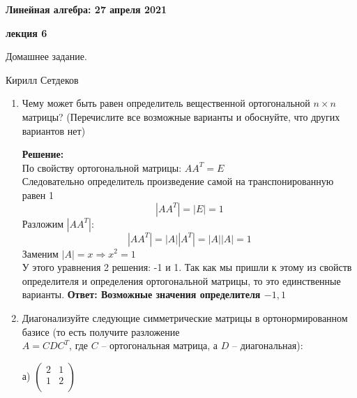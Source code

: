 \documentclass[a4paper,12pt]{article}
\newcounter{z}
\renewcommand{\date}{{\bf 27 апреля 2021}}
\newcommand{\HSEhat}{
\vspace*{-0pt}
\noindent
\setcounter{z}{0}


{\bf \phantom{\date}  \large \hfill Линейная алгебра: \hfill \normalsize \date}

\vspace{5 pt}
{\bf \large \hfill  лекция 6\hfill }

\vspace{15 pt}
\centerline{ \large  Домашнее задание.}
\centerline{ \large  Кирилл Сетдеков}



\vspace*{10pt}
\setcounter{z}{0}

}
\begin{document}
\HSEhat


\begin{enumerate}

\subsection*{Задачи:}



\item Чему может быть равен определитель вещественной ортогональной $n \times n$ матрицы? (Перечислите все возможные варианты и обоснуйте, что других вариантов нет)

\vspace{5pt}

\textbf{Решение:}\\
По свойству ортогональной матрицы: $AA^T = E$\\ 
Следовательно определитель произведение самой на транспонированную равен 1 $$|AA^T| = |E|=1$$
Разложим $|AA^T|$:
$$|AA^T|=|A||A^T|=|A||A|=1$$
Заменим $|A|=x\Rightarrow x^2 =1$\\
У этого уравнения 2 решения: -1 и 1. Так как мы пришли к этому из свойств определителя и определения ортогональной матрицы, то это единственные варианты.
\textbf{Ответ: Возможные значения определителя $-1,1$}


\item Диагонализуйте следующие симметрические матрицы в ортонормированном базисе (то есть получите разложение\\ $A = C D C^T$, где $C$ -- ортогональная матрица, а $D$ -- диагональная):

\vspace{5pt}


а)  
$
\begin{pmatrix}
{2}&{1}\\
{1}&{2}\\
\end{pmatrix}
$



\end{enumerate}
\end{document}
